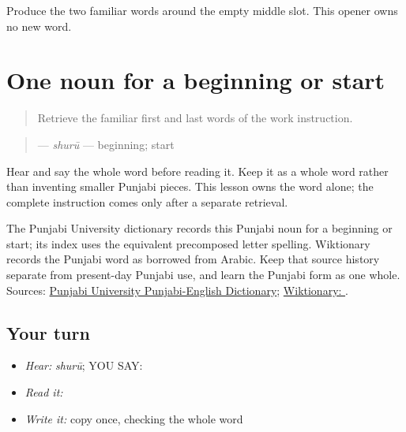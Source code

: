 \begin{tcolorbox}[breakable,colback=teal!4,colframe=teal!35!black,title={Before you move on}]
Produce the two familiar words around the empty middle slot. This opener owns no new word.
\end{tcolorbox}
\section[\texorpdfstring{\pa{ਸ਼ੁਰੂ} (shuruu)}{ਸ਼ੁਰੂ (shuruu)}]{One noun for a beginning or start}

\label{lesson:PA-C196-shuru}



\begin{quote}
Retrieve the familiar first and last words of the work instruction.
\end{quote}

\begin{grammarlens}[title={Grammar Lens: direct owner}]
\begin{quote}
\textbf{} — \emph{shurū} — beginning; start
\end{quote}

Hear and say the whole word before reading it. Keep it as a whole word rather than inventing smaller Punjabi pieces. This lesson owns the word alone; the complete instruction comes only after a separate retrieval.
\end{grammarlens}

\begin{tcolorbox}[breakable,skin=enhanced,colback=violet!6,colframe=violet!45!black,boxrule=0.5pt,arc=1mm,left=6pt,right=6pt,top=4pt,bottom=4pt,fonttitle=\bfseries,title={Across the family}]
The Punjabi University dictionary records this Punjabi noun for a beginning or start; its index uses the equivalent precomposed letter spelling. Wiktionary records the Punjabi word as borrowed from Arabic. Keep that source history separate from present-day Punjabi use, and learn the Punjabi form as one whole. Sources: \href{https://dic.learnpunjabi.org/default.aspx?look=\%E0\%A8\%B6\%E0\%A9\%81\%E0\%A8\%B0\%E0\%A9\%82}{Punjabi University Punjabi-English Dictionary}; \href{https://en.wiktionary.org/wiki/\%E0\%A8\%B8\%E0\%A8\%BC\%E0\%A9\%81\%E0\%A8\%B0\%E0\%A9\%82}{Wiktionary: }.
\end{tcolorbox}

\subsection*{Your turn}
\begin{itemize}
\raggedright
  \item \emph{Hear:} \emph{shurū}; YOU SAY: \textbf{}
  \item \emph{Read it:} \textbf{}
  \item \emph{Write it:} copy \textbf{} once, checking the whole word
\end{itemize}

